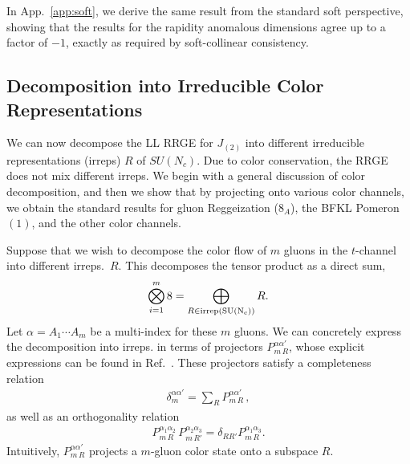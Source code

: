 \documentclass[letterpaper,11pt]{article}
\newcommand{\app}[1]{App.~\ref{app:#1}}
\begin{document}
In \app{soft}, we derive the same result from the standard soft perspective, showing that the results for the rapidity anomalous dimensions agree up to a factor of $-1$, exactly as required by soft-collinear consistency. 

\subsection{Decomposition into Irreducible Color Representations}
\label{sec:BFKL_color}

We can now decompose the LL RRGE for $J_{(2)}$ into different irreducible representations (irreps) $R$ of $SU(N_c)$. Due to color conservation, the RRGE does not mix different irreps.
We begin with a general discussion of color decomposition, and then we show that by projecting onto various color channels, we obtain the standard results for gluon Reggeization ($8_A$), the BFKL Pomeron $(1)$, and the other color channels.  

Suppose that we wish to decompose the color flow of $m$ gluons in the $t$-channel into different irreps.~$R$. This decomposes the tensor product as a direct sum,
\begin{align}
\bigotimes_{i = 1}^m 8 = \bigoplus_{R \in \rm{irrep}(SU(N_c))} R.
\end{align}
Let $\alpha = A_1 \cdots A_m$ be a multi-index for these $m$ gluons. We can concretely express the decomposition into irreps. in terms of projectors $P_{m\, R}^{\alpha \alpha'}$, whose explicit expressions can be found in Ref.~\cite{Keppeler:2012ih}. These projectors satisfy a completeness relation
\begin{align}\label{eq:proj_compl}
  \delta_{m}^{\alpha\alpha'} = \sum_R P_{m\, R}^{\alpha\alpha'}\,,
\end{align}
as well as an orthogonality relation
\begin{align}
  P_{m\, R}^{\alpha_1 \alpha_2}\, P_{m\, R'}^{\alpha_2\alpha_3} = \delta_{RR'} P_{m\, R}^{\alpha_1 \alpha_3}.
\end{align}
Intuitively, $P_{m\, R}^{\alpha \alpha'}$ projects a $m$-gluon color state onto a subspace $R$.
\end{document}
